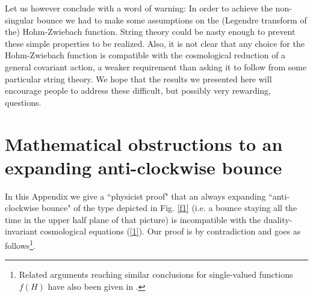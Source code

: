 \documentclass[a4paper,11pt]{article}
\begin{document}
Let us however conclude with a word of warning: In order to achieve the non-singular bounce we had to make some assumptions on the (Legendre transform of the) Hohm-Zwiebach function. String theory could be nasty enough to prevent these simple properties to be realized. Also, it is not clear that any choice for the  Hohm-Zwiebach function is compatible with the cosmological reduction of a general covariant action, a  weaker requirement than asking it to follow from some particular string theory.
We hope that the results we presented here will encourage people to address these difficult, but possibly very rewarding, questions.


\appendix
\section{Mathematical obstructions to an expanding anti-clockwise bounce}
\label{app}

In this Appendix we give a ``physicist proof" that an always expanding ``anti-clockwise bounce" of the type depicted in Fig. \ref{f1} (i.e.  a bounce staying all the time in the upper half plane of that picture)  is incompatible with the  duality-invariant cosmological equations (\ref{1}).  Our proof is by contradiction and goes as follows\footnote{Related arguments reaching similar conclusions for single-valued functions $f(H)$ have also been given in \cite{4}.}.
 
\end{document}
